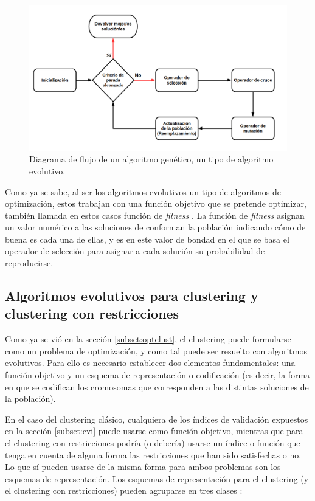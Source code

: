 \begin{figure}[h]
	\centering
	\includegraphics[width=1.0\textwidth]{Images/ga_flowchart}
	\caption[Codificación real.]{Diagrama de flujo de un algoritmo genético, un tipo de algoritmo evolutivo.}
	\label{fig:ga}
\end{figure}


Como ya se sabe, al ser los algoritmos evolutivos un tipo de algoritmos de optimización, estos trabajan con una función objetivo que se pretende optimizar, también llamada en estos casos función de \emph{fitness} \cite{coello2007evolutionary}. La función de \emph{fitness} asignan un valor numérico a las soluciones de conforman la población indicando cómo de buena es cada una de ellas, y es en este valor de bondad en el que se basa el operador de selección para asignar a cada solución su probabilidad de reproducirse.

\subsection{Algoritmos evolutivos para clustering y clustering con restricciones}\label{subsct:evolclust}

Como ya se vió en la sección \ref{subsct:optclust}, el clustering puede formularse como un problema de optimización, y como tal puede ser resuelto con algoritmos evolutivos. Para ello es necesario establecer dos elementos fundamentales: una función objetivo y un esquema de representación o codificación (es decir, la forma en que se codifican los cromosomas que corresponden a las distintas soluciones de la población).

En el caso del clustering clásico, cualquiera de los índices de validación expuestos en la sección \ref{subsct:cvi} puede usarse como función objetivo, mientras que para el clustering con restricciones podría (o debería) usarse un índice o función que tenga en cuenta de alguna forma las restricciones que han sido satisfechas o no. Lo que sí pueden usarse de la misma forma para ambos problemas son los esquemas de representación. Los esquemas de representación para el clustering (y el clustering con restricciones) pueden agruparse en tres clases \cite{jose2016automatic}:

